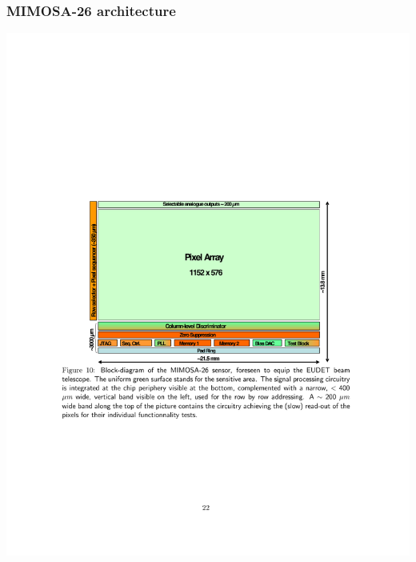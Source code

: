 \documentclass{beamer}
\begin{document}
  \begin{frame}[plain]
    \frametitle{MIMOSA-26 architecture}

    \begin{center}
      \includegraphics[width = \textwidth]{Pictures/mi26_architecture.pdf}
    \end{center}
  \end{frame}

\end{document}
